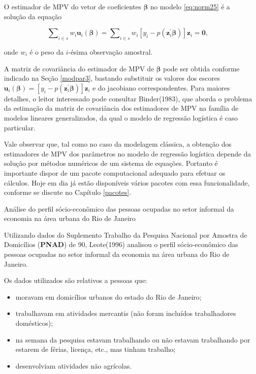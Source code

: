 \documentclass[]{book}
\numberwithin{example}{chapter}
\numberwithin{remark}{chapter}
\numberwithin{definition}{chapter}
\let\BeginKnitrBlock\begin \let\EndKnitrBlock\end
\begin{document}
O estimador de MPV do vetor de coeficientes \(\mathbf{\beta }\) no
modelo \eqref{eq:norm25} é a solução da equação

\begin{equation}
\sum\nolimits_{i\in s}w_{i}\mathbf{u}_{i}\left( \mathbf{\beta }\right)
=\sum\nolimits_{i\in s}w_{i}\left[ y_{i}-p\left( \mathbf{z}_{i}^{\prime }
\mathbf{\beta }\right) \right] \mathbf{z}_{i}=\mathbf{0},
\label{eq:norm27}
\end{equation}

onde \(w_{i}\) é o peso da \(i\)-ésima observação amostral.

A matriz de covariância do estimador de MPV de \(\mathbf{\beta }\) pode
ser obtida conforme indicado na Seção \ref{modpar3}, bastando substituir
os valores dos escores
\(\mathbf{u}_{i}\left( \mathbf{\beta}\right) =\left[ y_{i}-p\left(\mathbf{z}_{i}^{\prime }\mathbf{\beta }\right)\right] \mathbf{z}_{i}\)
e do jacobiano correspondentes. Para maiores detalhes, o leitor
interessado pode consultar Binder(1983), que aborda o problema da
estimação da matriz de covariância dos estimadores de MPV na família de
modelos lineares generalizados, da qual o modelo de regressão logística
é caso particular.

Vale observar que, tal como no caso da modelagem clássica, a obtenção
dos estimadores de MPV dos parâmetros no modelo de regressão logística
depende da solução por métodos numéricos de um sistema de equações.
Portanto é importante dispor de um pacote computacional adequado para
efetuar os cálculos. Hoje em dia já estão disponíveis vários pacotes com
essa funcionalidade, conforme se discute no Capítulo \ref{pacotes}.

\BeginKnitrBlock{example}
\protect\hypertarget{ex:pnad}{}{\label{ex:pnad}}Análise do perfil
sócio-econômico das pessoas ocupadas no setor informal da economia na
área urbana do Rio de Janeiro
\EndKnitrBlock{example}

Utilizando dados do Suplemento Trabalho da Pesquisa Nacional por Amostra
de Domicílios (\textbf{PNAD}) de 90, Leote(1996) analisou o perfil
sócio-econômico das pessoas ocupadas no setor informal da economia na
área urbana do Rio de Janeiro.

Os dados utilizados são relativos a pessoas que:

\begin{itemize}
\item
  moravam em domicílios urbanos do estado do Rio de Janeiro;
\item
  trabalhavam em atividades mercantis (não foram incluídos trabalhadores
  domésticos);
\item
  na semana da pesquisa estavam trabalhando ou não estavam trabalhando
  por estarem de férias, licença, etc., mas tinham trabalho;
\item
  desenvolviam atividades não agrícolas.
\end{itemize}
\end{document}
